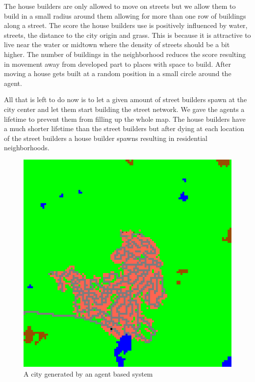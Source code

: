 \documentclass{scrartcl}
\begin{document}
The house builders are only allowed to move on streets but we allow them to build
in a small radius around them allowing for more than one row of buildings along a street.
The score the house builders use is positively influenced by water, streets, the
distance to the city origin and grass. This is because it is attractive to live
near the water or midtown where the density of streets should be a bit higher.
The number of buildings in the neighborhood reduces the score resulting in movement
away from developed part to places with space to build. After moving a house gets built
at a random position in a small circle around the agent.

All that is left to do now is to let a given amount of street builders spawn at the
city center and let them start  building the street network. We gave the agents
a lifetime to prevent them from filling up the whole map. The house builders
have a much shorter lifetime than the street builders but after dying at each location
of the street builders a house builder spawns resulting in residential neighborhoods.

\begin{figure}
  \centering
  \includegraphics[scale = 0.2]{city}
  \caption{A city generated by an agent based system}
\end{figure}
\end{document}
